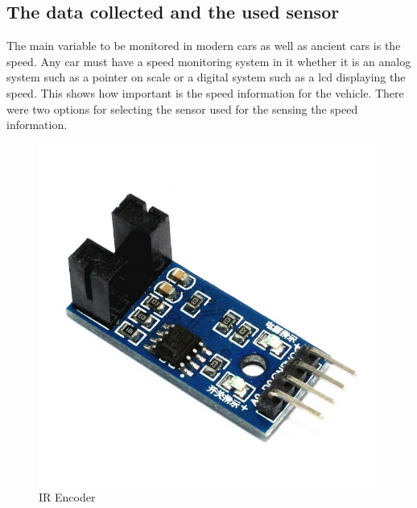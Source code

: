 \subsection{The data collected and the used sensor}
The main variable to be monitored in modern cars as well as ancient cars is the speed. Any car must have a speed monitoring system in it whether it is an analog system such as a pointer on scale or a digital system such as a lcd displaying the speed. This shows how important is the speed information for the vehicle.
There were two options for selecting the sensor used for the sensing the speed information.
\begin{figure}[h]
    \centering
    \includegraphics[scale=.5]{figuresEncoder/1.jpeg}
    \caption{IR Encoder}
\end{figure}
